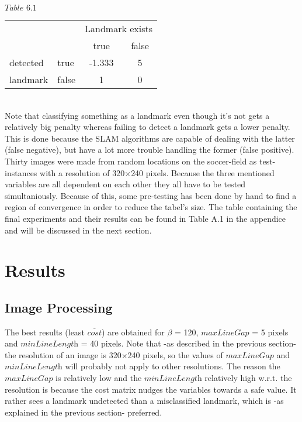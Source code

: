 \documentclass{ba-kecs}
\numberwithin{figure}{section}
\numberwithin{equation}{section}
\begin{document}
	$\textit{Table 6.1}$ \\
\begin{tabular}{ l l|c|c| }
\multicolumn{1}{r}{} & \multicolumn{1}{r}{} & \multicolumn{2}{c}{Landmark exists} \\
\multicolumn{1}{r}{} & \multicolumn{1}{r}{}
 &  \multicolumn{1}{c}{{\small true}}
 & \multicolumn{1}{c}{{\small false}} \\
\cline{3-4}
detected & {\small true} & -1.333 & 5 \\
\cline{3-4}
landmark & {\small false} & 1 & 0 \\
\cline{3-4}
\end{tabular} \\


Note that classifying something as a landmark even though it's not gets a relatively big penalty whereas failing to detect a landmark gets a lower penalty. This is done because the SLAM algorithms are capable of dealing with the latter (false negative), but have a lot more trouble handling the former (false positive). \\
Thirty images were made from random locations on the soccer-field as test-instances with a resolution of 320$\times$240 pixels.
Because the three mentioned variables are all dependent on each other they all have to be tested simultaniously. Because of this, some pre-testing has been done by hand to find a region of convergence in order to reduce the tabel's size. The table containing the final experiments and their results can be found in Table A.1 in the appendice and will be discussed in the next section.


\section{Results}

\subsection{Image Processing}
The best results (least $\overline{\textit{cost}}$) are obtained for $\beta$ = 120,  $\textit{maxLineGap}$ = 5 pixels and $\textit{minLineLength}$ = 40 pixels. Note that -as described in the previous section- the resolution of an image is 320$\times$240 pixels, so the values of $\textit{maxLineGap}$ and $\textit{minLineLength}$ will probably not apply to other resolutions.
The reason the $\textit{maxLineGap}$ is relatively low and the $\textit{minLineLength}$ relatively high w.r.t. the resolution is because the cost matrix nudges the variables towards a safe value. It rather sees a landmark undetected than a misclassified landmark, which is -as explained in the previous section- preferred.
\end{document}
